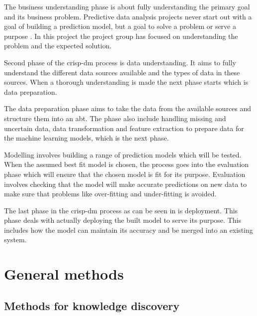 \documentclass[english, a4paper]{report}
\begin{document}
{{{            The business understanding phase is about fully understanding the primary goal and its business problem. Predictive data analysis projects never start out with a goal of building a prediction model, but a goal to solve a problem or serve a purpose \cite{mlKelleher}. In this project the project group has focused on understanding the problem and the expected solution.
            \par 
            Second phase of the \gls{crisp-dm} process is data understanding. It aims to fully understand the different data sources available and the types of data in these sources. When a thorough understanding is made the next phase starts which is data preparation.
            \par 
            The data preparation phase aims to take the data from the available sources and structure them into an \gls{abt}. The phase also include handling missing and uncertain data, data transformation and feature extraction to prepare data for the machine learning models, which is the next phase.
            \par 
            Modelling involves building a range of prediction models which will be tested. When the assumed best fit model is chosen, the process goes into the evaluation phase which will ensure that the chosen model is fit for its purpose. Evaluation involves checking that the model will make accurate predictions on new data to make sure that problems like over-fitting and under-fitting is avoided.
            \par 
            The last phase in the \gls{crisp-dm} process as can be seen in  is deployment. This phase deals with actually deploying the built model to serve its purpose. This includes how the model can maintain its accuracy and be merged into an existing system.

        }
    }
    
    \section{General methods}
    {
        \subsection{Methods for knowledge discovery} \label{knowledge-discovery-methods}
        {
}}}
\end{document}
